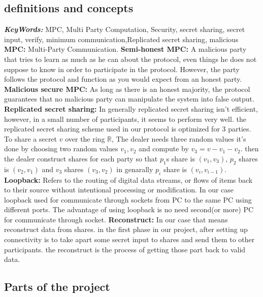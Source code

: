 \documentclass[12pt]{article}
\providecommand{\keywords}[1]{\textbf{\textit{KeyWords:}} #1}
\begin{document}
\subsection{definitions and concepts}
\keywords{MPC, Multi Party Computation, Security, secret sharing, secret input, verify, minimum communication,Replicated secret sharing, malicious}\hfill\break\hfill\break
\textbf{MPC:} Multi-Party Communication.\hfill\break\hfill\break
\textbf{Semi-honest MPC:} A malicious party that tries to learn as much as he can about the protocol, even things he does not suppose to know in order to participate in the protocol. However, the party follows the protocol and function as you would expect from an honest party.\hfill\break\hfill\break
\textbf{Malicious secure MPC:} As long as there is an honest majority, the protocol guarantees that no malicious party can manipulate the system into false output. \hfill\break \hfill\break
\textbf{Replicated secret sharing:} In generally replicated secret sharing isn’t efficient, however, in a small number of participants, it seems to perform very well. the replicated secret sharing scheme used in our protocol is optimized for 3 parties. \hfill\break
To share a secret $v$ over the ring $\mathbb{R}$, The dealer needs three random values it’s done by choosing two random values $v_1, v_2$ and compute by $v_3 = v - v_1 - v_2$. then the dealer construct shares for each party so that $p_1$s share is $(v_1,v_3)$, $p_2$ shares is $(v_2,v_1)$ and $v_3$ shares $(v_3,v_2)$ in genarally $p_i$ share is $(v_i,v_{i-1})$.
\hfill\break\hfill\break
\textbf{Loopback:} Refers to the routing of digital data streams, or flows of items back to their source without intentional processing or modification. In our case loopback used for communicate through sockets from PC to the same PC using different ports. The advantage of using loopback is no need second(or more) PC for communicate through socket.
\hfill\break\hfill\break
\textbf{Reconstruct:} In our case that means reconstruct data from shares. in the first phase in our project, after setting up connectivity is to take apart some secret input to shares and send them to other participants. the reconstruct is the process of getting those part back to valid data.  


\subsection{Parts of the project}
\end{document}
